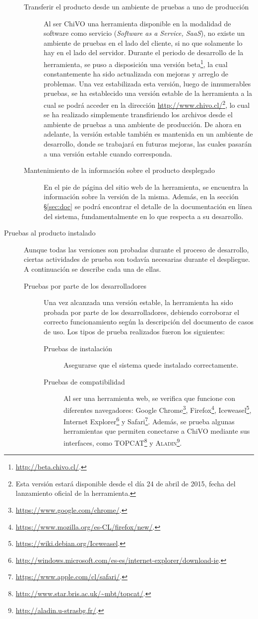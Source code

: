 \begin{description}
\begin{description}
			\item [Transferir el producto desde un ambiente de pruebas a uno de producción] Al ser ChiVO una herramienta disponible en la modalidad de software como servicio (\emph{Software as a Service, SaaS}), no existe un ambiente de pruebas en el lado del cliente, si no que solamente lo hay en el lado del servidor. Durante el periodo de desarrollo de la herramienta, se puso a disposición una versión beta\footnote{\url{http://beta.chivo.cl/}.}, la cual constantemente ha sido actualizada con mejoras y arreglo de problemas. Una vez estabilizada esta versión, luego de innumerables pruebas, se ha establecido una versión estable de la herramienta a la cual se podrá acceder en la dirección \url{http://www.chivo.cl/}\footnote{Esta versión estará disponible desde el día 24 de abril de 2015, fecha del lanzamiento oficial de la herramienta.}, lo cual se ha realizado simplemente transfiriendo los archivos desde el ambiente de pruebas a una ambiente de producción. De ahora en adelante, la versión estable tambi\'en es mantenida en un ambiente de desarrollo, donde se trabajará en futuras mejoras, las cuales pasarán a una versión estable cuando corresponda.
			\item [Mantenimiento de la información sobre el producto desplegado] En el pie de página del sitio web de la herramienta, se encuentra la información sobre la versión de la misma. Además, en la sección \S\ref{sec:doc} se podrá encontrar el detalle de la documentación en línea del sistema, fundamentalmente en lo que respecta a su desarrollo.
		\end{description}
	\item [Pruebas al producto instalado] Aunque todas las versiones son probadas durante el proceso de desarrollo, ciertas actividades de prueba son todavía necesarias durante el despliegue. A continuación se describe cada una de ellas.
		\begin{description}
			\item [Pruebas por parte de los desarrolladores] Una vez alcanzada una versión estable, la herramienta ha sido probada por parte de los desarrolladores, debiendo corroborar el correcto funcionamiento según la descripción del documento de casos de uso. Los tipos de prueba realizados fueron los siguientes:
				\begin{description}
					\item[Pruebas de instalación] Asegurarse que el sistema quede instalado correctamente.
					\item[Pruebas de compatibilidad] Al ser una herramienta web, se verifica que funcione con diferentes navegadores: Google Chrome\footnote{\url{https://www.google.com/chrome/}.}, Firefox\footnote{\url{https://www.mozilla.org/es-CL/firefox/new/}.}, Iceweasel\footnote{\url{https://wiki.debian.org/Iceweasel}.}, Internet Explorer\footnote{\url{http://windows.microsoft.com/es-es/internet-explorer/download-ie}.} y Safari\footnote{\url{https://www.apple.com/cl/safari/}.}. Además, se prueba algunas herramientas que permiten conectarse a ChiVO mediante sus interfaces, como \textsc{TOPCAT}\footnote{\url{http://www.star.bris.ac.uk/~mbt/topcat/}.} y \textsc{Aladin}\footnote{\url{http://aladin.u-strasbg.fr/}.}.

\end{description}
\end{description}
\end{description}
